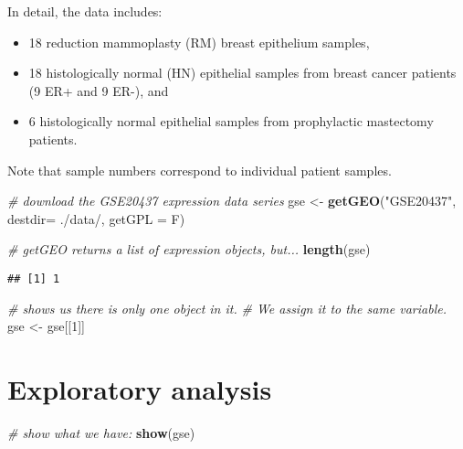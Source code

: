 \documentclass[
]{article}
\newenvironment{Shaded}{\begin{snugshade}}{\end{snugshade}}
\newcommand{\AttributeTok}[1]{\textcolor[rgb]{0.13,0.29,0.53}{#1}}
\newcommand{\CommentTok}[1]{\textcolor[rgb]{0.56,0.35,0.01}{\textit{#1}}}
\newcommand{\DecValTok}[1]{\textcolor[rgb]{0.00,0.00,0.81}{#1}}
\newcommand{\FunctionTok}[1]{\textcolor[rgb]{0.13,0.29,0.53}{\textbf{#1}}}
\newcommand{\NormalTok}[1]{#1}
\newcommand{\OtherTok}[1]{\textcolor[rgb]{0.56,0.35,0.01}{#1}}
\newcommand{\StringTok}[1]{\textcolor[rgb]{0.31,0.60,0.02}{#1}}
\begin{document}
In detail, the data includes:

\begin{itemize}
\item
  18 reduction mammoplasty (RM) breast epithelium samples,
\item
  18 histologically normal (HN) epithelial samples from breast cancer
  patients (9 ER+ and 9 ER-), and
\item
  6 histologically normal epithelial samples from prophylactic
  mastectomy patients.
\end{itemize}

Note that sample numbers correspond to individual patient samples.

\begin{Shaded}
\begin{Highlighting}[]
\CommentTok{\# download the GSE20437 expression data series}
\NormalTok{gse }\OtherTok{\textless{}{-}} \FunctionTok{getGEO}\NormalTok{(}\StringTok{"GSE20437"}\NormalTok{, }\AttributeTok{destdir=} \StringTok{\textquotesingle{}./data/\textquotesingle{}}\NormalTok{, }\AttributeTok{getGPL =}\NormalTok{ F)}
\end{Highlighting}
\end{Shaded}

\begin{Shaded}
\begin{Highlighting}[]
\CommentTok{\# getGEO returns a list of expression objects, but...}
\FunctionTok{length}\NormalTok{(gse) }
\end{Highlighting}
\end{Shaded}

\begin{verbatim}
## [1] 1
\end{verbatim}

\begin{Shaded}
\begin{Highlighting}[]
\CommentTok{\# shows us there is only one object in it. }
\CommentTok{\# We assign it to the same variable.}
\NormalTok{gse }\OtherTok{\textless{}{-}}\NormalTok{ gse[[}\DecValTok{1}\NormalTok{]]}
\end{Highlighting}
\end{Shaded}

\section{Exploratory analysis}\label{exploratory-analysis}

\begin{Shaded}
\begin{Highlighting}[]
\CommentTok{\# show what we have:}
\FunctionTok{show}\NormalTok{(gse)}
\end{Highlighting}
\end{Shaded}
\end{document}
